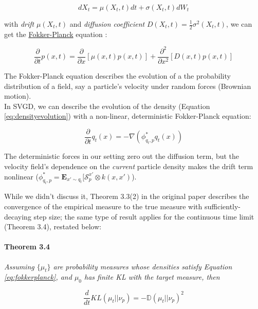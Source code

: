 \documentclass[12pt]{article}
\begin{document}
\begin{equation}
    dX_t = \mu(X_t, t)dt + \sigma(X_t, t)dW_t
\end{equation}

\noindent with \textit{drift} $\mu(X_t, t)$ and \textit{diffusion coefficient} $D(X_t, t) = \frac{1}{2}\sigma^2(X_t, t)$, we can get the \href{https://en.wikipedia.org/wiki/Fokker\%E2\%80\%93Planck_equation}{Fokker-Planck} equation \cite{fokkerplanck}:

\begin{equation}
    \frac{\partial}{\partial t}p(x, t) = \frac{\partial}{\partial x}[\mu(x, t)p(x, t)] + \frac{\partial^2}{\partial x^2}[D(x,t)p(x,t)]
\end{equation}

\noindent The Fokker-Planck equation describes the evolution of a the probability distribution of a field, say a particle's velocity under random forces (Brownian motion).  \\

\noindent In SVGD, we can describe the evolution of the density (Equation \ref{eq:densityevolution}) with a non-linear, deterministic Fokker-Planck equation:

\begin{equation}
    \frac{\partial}{\partial t}q_t(x) = - \nabla(\phi^*_{q_t, p}q_t(x))
    \label{eq:fokkerplanck}
\end{equation}

\noindent The deterministic forces in our setting zero out the diffusion term, but the velocity field's dependence on the \textit{current} particle density makes the drift term nonlinear ($\phi^*_{q_t, p} = \mathbf{E}_{x' \sim q_t}[\mathcal{S}^{x'}_p \otimes k(x, x')$).

\noindent While we didn't discuss it, Theorem 3.3(2) in the original paper describes the convergence of the empirical measure to the true measure with sufficiently-decaying step size; the same type of result applies for the continuous time limit (Theorem 3.4), restated below:

\paragraph{Theorem 3.4} \textit{Assuming $\{ \mu_t \}$ are probability measures whose densities satisfy Equation \ref{eq:fokkerplanck}, and $\mu_0$ has finite KL with the target measure, then}

\begin{equation*}
    \frac{d}{dt}KL(\mu_t || \nu_p) = -\mathbb{D}(\mu_t || \nu_p)^2
    \label{thm:continuousqthm}
\end{equation*} \\
\end{document}
